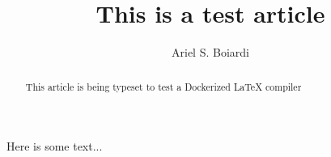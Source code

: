 \documentclass{article}
\title{This is a test article}
\author{Ariel S. Boiardi}
\begin{document}
    \maketitle

    \begin{abstract}
        This article is being typeset to test a Dockerized LaTeX compiler
    \end{abstract}

    Here is some text...
\end{document}

